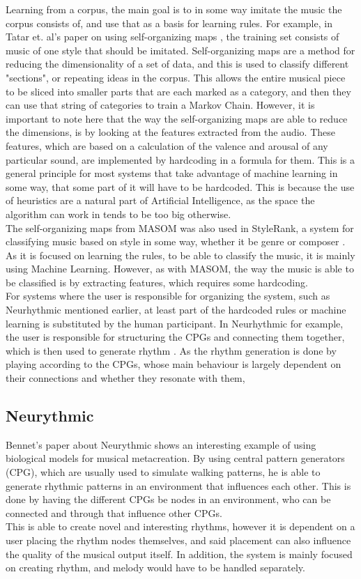 \documentclass[a4paper,english]{report}
\begin{document}
	Learning from a corpus, the main goal is to in some way imitate the music the corpus consists of, and use that as a basis for learning rules. For example, in Tatar et. al's paper on using self-organizing maps \cite{tatar2017masom}, the training set consists of music of one style that should be imitated. Self-organizing maps are a method for reducing the dimensionality of a set of data, and this is used to classify different "sections", or repeating ideas in the corpus. This allows the entire musical piece to be sliced into smaller parts that are each marked as a category, and then they can use that string of categories to train a Markov Chain. However, it is important to note here that the way the self-organizing maps are able to reduce the dimensions, is by looking at the features extracted from the audio. These features, which are based on a calculation of the valence and arousal of any particular sound, are implemented by hardcoding in a formula for them. This is a general principle for most systems that take advantage of machine learning in some way, that some part of it will have to be hardcoded. This is because the use of heuristics are a natural part of Artificial Intelligence, as the space the algorithm can work in tends to be too big otherwise.\\
	The self-organizing maps from MASOM was also used in StyleRank, a system for classifying music based on style in some way, whether it be genre or composer \cite{ens2020quantifying}. As it is focused on learning the rules, to be able to classify the music, it is mainly using Machine Learning. However, as with MASOM, the way the music is able to be classified is by extracting features, which requires some hardcoding.\\
	For systems where the user is responsible for organizing the system, such as Neurhythmic mentioned earlier, at least part of the hardcoded rules or machine learning is substituted by the human participant. In Neurhythmic for example, the user is responsible for structuring the CPGs and connecting them together, which is then used to generate rhythm \cite{bennett2018neurythmic}. As the rhythm generation is done by playing according to the CPGs, whose main behaviour is largely dependent on their connections and whether they resonate with them, 
	\iffalse
	\subsection{Neurythmic}
	Bennet's paper about Neurythmic shows an interesting example of using biological models for musical metacreation. By using central pattern generators (CPG), which are usually used to simulate walking patterns, he is able to generate rhythmic patterns in an environment that influences each other. This is done by having the different CPGs be  nodes in an environment, who can be connected and through that influence other CPGs.\\
	This is able to create novel and interesting rhythms, however it is dependent on a user placing the rhythm nodes themselves, and said placement can also influence the quality of the musical output itself. In addition, the system is mainly focused on creating rhythm, and melody would have to be handled separately.
	
\end{document}
